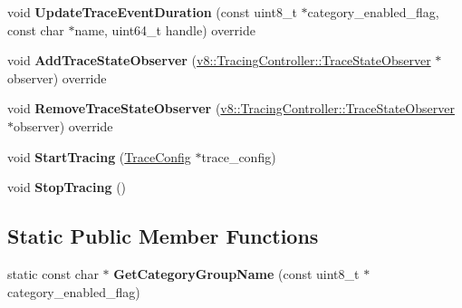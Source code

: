 \begin{DoxyCompactItemize}
\item 
\mbox{\label{classv8_1_1platform_1_1tracing_1_1TracingController_ade75afc5e244dc4c9152c040cffc7930}} 
void {\bfseries Update\+Trace\+Event\+Duration} (const uint8\+\_\+t $\ast$category\+\_\+enabled\+\_\+flag, const char $\ast$name, uint64\+\_\+t handle) override
\item 
\mbox{\label{classv8_1_1platform_1_1tracing_1_1TracingController_adddb712334bc9fd3e5c18b5f7d5e1c25}} 
void {\bfseries Add\+Trace\+State\+Observer} (\mbox{\hyperlink{classv8_1_1TracingController_1_1TraceStateObserver}{v8\+::\+Tracing\+Controller\+::\+Trace\+State\+Observer}} $\ast$observer) override
\item 
\mbox{\label{classv8_1_1platform_1_1tracing_1_1TracingController_ad268fa7dd8f0182092a48da0cd28d73e}} 
void {\bfseries Remove\+Trace\+State\+Observer} (\mbox{\hyperlink{classv8_1_1TracingController_1_1TraceStateObserver}{v8\+::\+Tracing\+Controller\+::\+Trace\+State\+Observer}} $\ast$observer) override
\item 
\mbox{\label{classv8_1_1platform_1_1tracing_1_1TracingController_a3362b081a3ba0eeff68655402d604e8f}} 
void {\bfseries Start\+Tracing} (\mbox{\hyperlink{classv8_1_1platform_1_1tracing_1_1TraceConfig}{Trace\+Config}} $\ast$trace\+\_\+config)
\item 
\mbox{\label{classv8_1_1platform_1_1tracing_1_1TracingController_a7d617c726ecbd7a80bff714911957168}} 
void {\bfseries Stop\+Tracing} ()
\end{DoxyCompactItemize}
\subsection*{Static Public Member Functions}
\begin{DoxyCompactItemize}
\item 
\mbox{\label{classv8_1_1platform_1_1tracing_1_1TracingController_ad32e754f9d03b3d232482e474700c67c}} 
static const char $\ast$ {\bfseries Get\+Category\+Group\+Name} (const uint8\+\_\+t $\ast$category\+\_\+enabled\+\_\+flag)
\end{DoxyCompactItemize}
